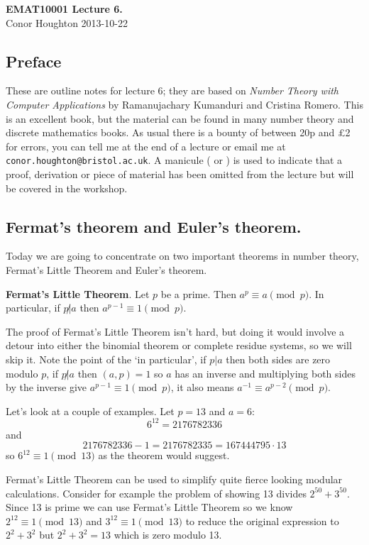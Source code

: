 \documentclass[12pt]{article}
\begin{document}
\begin{center}
{\bf EMAT10001 Lecture 6.}\\[1cm]{} Conor Houghton 2013-10-22
\end{center}
\subsection*{Preface} 
These are outline notes for lecture 6; they are based on \emph{Number
  Theory with Computer Applications} by Ramanujachary Kumanduri and
Cristina Romero. This is an excellent book, but the material can be
found in many number theory and discrete mathematics books. As usual
there is a bounty of between 20p and \pounds 2 for errors, you can
tell me at the end of a lecture or email me at
\texttt{conor.houghton{@}bristol.ac.uk}. A manicule (\HandLeft{} or \HandRight) is used to
indicate that a proof, derivation or piece of material has been
omitted from the lecture but will be covered in the workshop.

\subsection*{Fermat's theorem and Euler's theorem.}

Today we are going to concentrate on two important theorems in number theory, Fermat's Little Theorem and Euler's theorem. 

\noindent \textbf{Fermat's Little Theorem}. Let $p$ be a prime. Then $a^p\equiv a\pmod p$. In particular, if $p\not|a$ then $a^{p-1}\equiv 1 \pmod p$.

The proof of Fermat's Little Theorem isn't hard, but doing it would
involve a detour into either the binomial theorem or complete residue
systems, so we will skip it. Note the point of the \lq{}in
particular\rq{}, if $p|a$ then both sides are zero modulo $p$, if
$p\not|a$ then $(a,p)=1$ so $a$ has an inverse and multiplying both
sides by the inverse give $a^{p-1}\equiv 1 \pmod p$, it also means
$a^{-1}\equiv a^{p-2}\pmod p$.

Let's look at a couple of examples. Let $p=13$ and $a=6$:
\begin{equation}
6^{12}=2176782336
\end{equation}
and
\begin{equation}
2176782336-1=2176782335=167444795\cdot 13
\end{equation}
so $6^{12}\equiv 1 \pmod{13}$ as the theorem would suggest.

Fermat's Little Theorem can be used to simplify quite fierce
looking modular calculations. Consider for example the problem of
showing 13 divides $2^{50}+3^{50}$. Since 13 is prime we can use
Fermat's Little Theorem so we know $2^{12}\equiv 1\pmod{13}$ and
$3^{12}\equiv 1\pmod{13}$ to reduce the original expression to
$2^2+3^2$ but $2^2+3^2=13$ which is zero modulo 13.
\end{document}
